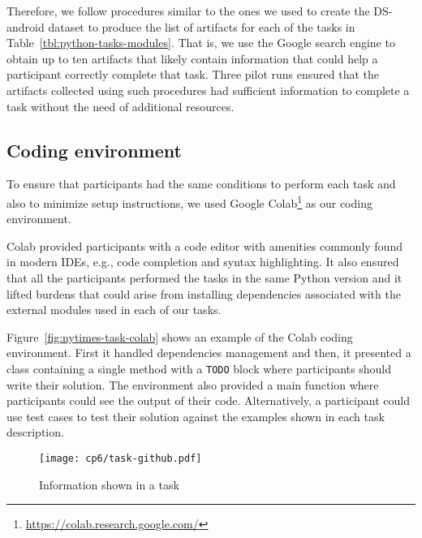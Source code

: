 Therefore,
we follow procedures similar to the ones we used to create the \acs{DS-android} dataset to produce the list of artifacts for each of the tasks in Table~\ref{tbl:python-tasks-modules}. 
That is, we use the Google search engine to obtain up to ten artifacts that likely contain 
information that could help a participant correctly complete that task. 
Three pilot runs ensured that the artifacts collected using such procedures had sufficient information to complete a task without 
the need of additional resources. 






\subsection{Coding environment}
\label{cp6:coding-environment}



To ensure that participants had the same conditions to perform each task
and also to minimize setup instructions, we used Google Colab\footnote{\url{https://colab.research.google.com/}} as our coding environment. 


Colab provided participants with a code editor with amenities commonly found in modern IDEs, e.g., code completion and syntax highlighting. It also ensured that all the participants 
performed the tasks in the same Python version and it lifted 
burdens that could arise from installing dependencies associated with the external modules used in each of our tasks. 


Figure~\ref{fig:nytimes-task-colab} shows an example of the Colab coding environment. 
First it handled dependencies management and then, 
it presented a class containing a single method with a \texttt{TODO} block where 
participants should write their solution. 
The environment also provided a main function where participants could see the output
of their code. Alternatively, a participant could use test cases to test their solution
against the examples shown in each task description.



\clearpage

\begin{figure}
    \centering
    \texttt{[image: cp6/task-github.pdf]}
    \caption{Information shown in a task}
    \label{fig:nytimes-task-github}
\end{figure}



\clearpage

